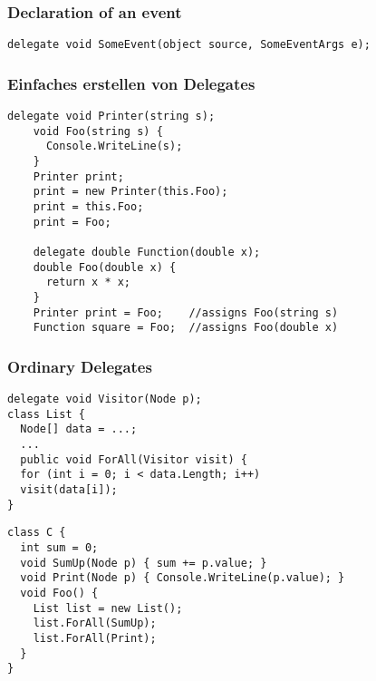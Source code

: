 \subsubsection{Declaration of an event}
\begin{lstlisting}
delegate void SomeEvent(object source, SomeEventArgs e);
\end{lstlisting}


\subsubsection{Einfaches erstellen von Delegates}
\begin{lstlisting}[style=CSharp]
	delegate void Printer(string s);
	void Foo(string s) {
	  Console.WriteLine(s);
	}
	Printer print;
	print = new Printer(this.Foo);
	print = this.Foo;
	print = Foo;
	
	delegate double Function(double x);
	double Foo(double x) {
	  return x * x;
	}
	Printer print = Foo;    //assigns Foo(string s)
	Function square = Foo;  //assigns Foo(double x)
\end{lstlisting}


\subsubsection{Ordinary Delegates}
\begin{multicols}{2}
	
\begin{lstlisting}[style=CSharp]
delegate void Visitor(Node p);
class List {
  Node[] data = ...;
  ...
  public void ForAll(Visitor visit) {
  for (int i = 0; i < data.Length; i++)
  visit(data[i]);
}
\end{lstlisting}

\columnbreak
  
\begin{lstlisting}[style=CSharp]
class C {
  int sum = 0;
  void SumUp(Node p) { sum += p.value; }
  void Print(Node p) { Console.WriteLine(p.value); }
  void Foo() {
    List list = new List();
    list.ForAll(SumUp);
    list.ForAll(Print);
  }
}
  \end{lstlisting}

\end{multicols}

